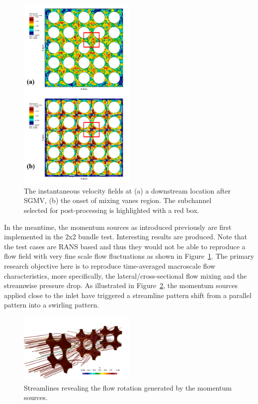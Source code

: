\begin{figure}[!ht]
\centering
\includegraphics[width=0.5\textwidth]{./figures/LES_solutions_bundle5x5.png}
\caption{The instantaneous velocity fields at (a) a downstream location after SGMV, (b) the onset of mixing vanes region. The subchannel selected for post-processing is highlighted with a red box. }
\label{fig:velles}
\end{figure}

In the meantime, the momentum sources as introduced previously are first implemented in the 2x2 bundle test.
Interesting results are produced. Note that the test cases are RANS based and thus they would not be able to reproduce a flow field with very fine scale flow fluctuations as shown in Figure~\ref{fig:velles}.
The primary research objective here is to reproduce time-averaged macroscale flow characteristics, more specifically, the lateral/cross-sectional flow mixing and the streamwise pressure drop.
As illustrated in Figure~\ref{fig:streamline}, the momentum sources applied close to the inlet have triggered a streamline pattern shift from a parallel pattern into a swirling pattern.

\begin{figure}[!ht]
\centering
\includegraphics[width=0.5\textwidth]{./figures/RANS_streamlines_bundle2x2.png}
\caption{Streamlines revealing the flow rotation generated by the momentum sources. }
\label{fig:streamline}
\end{figure}

